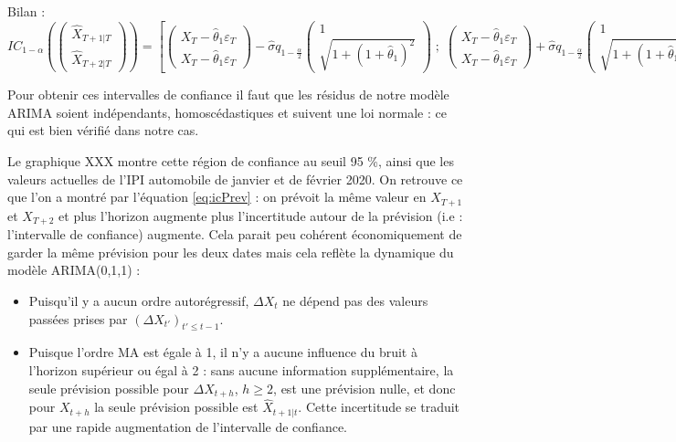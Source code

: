 \documentclass[]{article}
\begin{document}
Bilan :
\begin{equation}
IC_{1-\alpha}\left(\begin{pmatrix} \hat X_{T+1\vert T}
\\ \hat X_{T+2\vert T}\end{pmatrix}\right) =
\left[
  \begin{pmatrix} 
    X_T - \hat\theta_1\varepsilon_T 
    \\ X_T - \hat\theta_1\varepsilon_T 
  \end{pmatrix}
  -
  \hat\sigma q_{1-\frac \alpha 2}
  \begin{pmatrix} 
    1\\
    \sqrt{1+(1+\hat \theta_1)^2}
  \end{pmatrix}
  \;;\;
  \begin{pmatrix} 
    X_T - \hat\theta_1\varepsilon_T 
    \\ X_T - \hat\theta_1\varepsilon_T 
  \end{pmatrix}
  +
  \hat\sigma q_{1-\frac \alpha 2}
  \begin{pmatrix} 
    1\\
    \sqrt{1+(1+\hat \theta_1)^2}
  \end{pmatrix}
\right]
\label{eq:icPrev}
\end{equation}

Pour obtenir ces intervalles de confiance il faut que les résidus de notre modèle ARIMA soient indépendants, homoscédastiques et suivent une loi normale : ce qui est bien vérifié dans notre cas.

Le graphique XXX montre cette région de confiance au seuil 95 \%, ainsi que les valeurs actuelles de l'IPI automobile de janvier et de février 2020.
On retrouve ce que l'on a montré par l'équation \eqref{eq:icPrev} : on prévoit la même valeur en \(X_{T+1}\) et \(X_{T+2}\) et plus l'horizon augmente plus l'incertitude autour de la prévision (i.e : l'intervalle de confiance) augmente.
Cela parait peu cohérent économiquement de garder la même prévision pour les deux dates mais cela reflète la dynamique du modèle ARIMA(0,1,1) :

\begin{itemize}
\item
  Puisqu'il y a aucun ordre autorégressif, \(\Delta X_t\) ne dépend pas des valeurs passées prises par \((\Delta X_{t'})_{t'\leq t-1}\).
\item
  Puisque l'ordre MA est égale à 1, il n'y a aucune influence du bruit à l'horizon supérieur ou égal à 2 : sans aucune information supplémentaire, la seule prévision possible pour \(\Delta X_{t+h}\), \(h\geq 2\), est une prévision nulle, et donc pour \(X_{t+h}\) la seule prévision possible est \(\hat X_{t+1\vert t}\).
  Cette incertitude se traduit par une rapide augmentation de l'intervalle de confiance.
\end{itemize}
\end{document}
